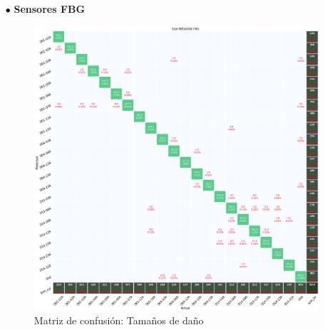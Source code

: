\begin{itemize}
    \item[$\bullet$] \textbf{Sensores FBG}

    \begin{figure}[H]
        \centering
        \includegraphics[width=150mm]{3/Fotos/Ty_Si_INESASSE_confusion.png}
        \captionsetup{justification=centering,margin=1.25cm}
        \caption{Matriz de confusión: Tamaños de daño}
        \label{fig:CM_FBG_Ty_Si}
    \end{figure} 


\end{itemize}
